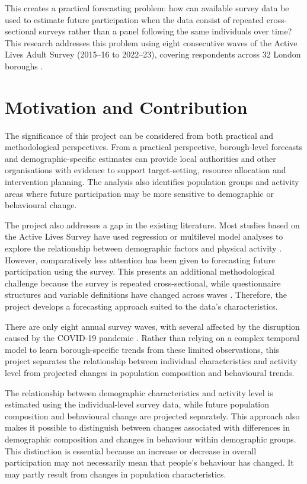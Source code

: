 \documentclass[ %
                    author={Ashrey Ashrey, Sanya Kapoor, Trisha Sharma, Yash Bhooshan Pandloskar},
                supervisor={Dr. Dalila O’Grady},
                    degree={MSc},
                     title={Using machine learning to forecast physical activity participation, volunteering and activity patterns in London},
                  subtitle={},
                      type={},
                      year={2021}]{dissertation}
\begin{document}
This creates a practical forecasting problem: how can available survey data be used to estimate future participation when the data consist of repeated cross-sectional surveys rather than a panel following the same individuals over time? This research addresses this problem using eight consecutive waves of the Active Lives Adult Survey (2015--16 to 2022--23), covering respondents across 32 London boroughs \cite{sport_england_active_lives}.


\section{Motivation and Contribution}

The significance of this project can be considered from both practical and methodological perspectives. From a practical perspective, borough-level forecasts and demographic-specific estimates can provide local authorities and other organisations with evidence to support target-setting, resource allocation and intervention planning. The analysis also identifies population groups and activity areas where future participation may be more sensitive to demographic or behavioural change.

The project also addresses a gap in the existing literature. Most studies based on the Active Lives Survey have used regression or multilevel model analyses to explore the relationship between demographic factors and physical activity \cite{brainard_etal_2019,brinkley_etal_2024}. However, comparatively less attention has been given to forecasting future participation using the survey. This presents an additional methodological challenge because the survey is repeated cross-sectional, while questionnaire structures and variable definitions have changed across waves \cite{sport_england_active_lives}. Therefore, the project develops a forecasting approach suited to the data's characteristics.

There are only eight annual survey waves, with several affected by the disruption caused by the COVID-19 pandemic \cite{sport_england_active_lives}. Rather than relying on a complex temporal model to learn borough-specific trends from these limited observations, this project separates the relationship between individual characteristics and activity level from projected changes in population composition and behavioural trends.

The relationship between demographic characteristics and activity level is estimated using the individual-level survey data, while future population composition and behavioural change are projected separately. This approach also makes it possible to distinguish between changes associated with differences in demographic composition and changes in behaviour within demographic groups. This distinction is essential because an increase or decrease in overall participation may not necessarily mean that people's behaviour has changed. It may partly result from changes in population characteristics.
\end{document}
